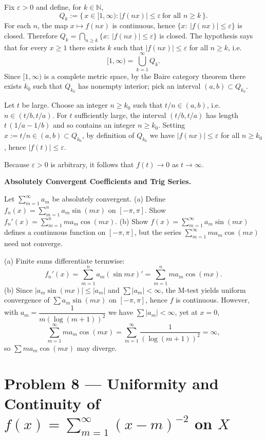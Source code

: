 \begin{solution}
Fix $\varepsilon>0$ and define, for $k\in\mathbb{N}$,
	\[
	Q_k:=\{\,x\in[1,\infty): |f(nx)|\le\varepsilon\ \text{for all } n\ge k\,\}.
	\]
	For each $n$, the map $x\mapsto f(nx)$ is continuous, hence
	$\{x:\ |f(nx)|\le\varepsilon\}$ is closed. Therefore $Q_k=\bigcap_{n\ge k}\{x:\ |f(nx)|\le\varepsilon\}$
	is closed. The hypothesis says that for every $x\ge1$ there exists $k$ such that
	$|f(nx)|\le\varepsilon$ for all $n\ge k$, i.e.
	\[
	[1,\infty)=\bigcup_{k=1}^\infty Q_k .
	\]
	Since $[1,\infty)$ is a complete metric space, by the Baire category theorem there exists
	$k_0$ such that $Q_{k_0}$ has nonempty interior; pick an interval $(a,b)\subset Q_{k_0}$.

	Let $t$ be large. Choose an integer $n\ge k_0$ such that $t/n\in(a,b)$, i.e.\ $n\in(t/b,t/a)$.
	For $t$ sufficiently large, the interval $(t/b,t/a)$ has length $t\,(1/a-1/b)$ and so contains
	an integer $n\ge k_0$. Setting $x:=t/n\in(a,b)\subset Q_{k_0}$, by definition of $Q_{k_0}$ we have
	$|f(nx)|\le\varepsilon$ for all $n\ge k_0$, hence $|f(t)|\le\varepsilon$.

	Because $\varepsilon>0$ is arbitrary, it follows that $f(t)\to 0$ as $t\to\infty$.
\end{solution}

\begin{problem}[CP-II-0342]
\label{prob:cp-ii-0342}
\textbf{Absolutely Convergent Coefficients and Trig Series.}

\hspace*{1.5em}Let $\sum_{m=1}^\infty a_m$ be absolutely convergent.
(a) Define $f_n(x)=\sum_{m=1}^n a_m\sin(mx)$ on $[-\pi,\pi]$. Show $f_n'(x)=\sum_{m=1}^n m a_m\cos(mx)$.
(b) Show $f(x)=\sum_{m=1}^\infty a_m\sin(mx)$ defines a continuous function on $[-\pi,\pi]$, but the series
$\sum_{m=1}^\infty m a_m\cos(mx)$ need not converge.
\end{problem}

\begin{solution}
(a) Finite sums differentiate termwise:
\[
f_n'(x)=\sum_{m=1}^n a_m(\sin mx)' = \sum_{m=1}^n m a_m\cos(mx).
\]
(b) Since $|a_m\sin(mx)|\le|a_m|$ and $\sum|a_m|<\infty$, the M-test yields uniform convergence of
$\sum a_m\sin(mx)$ on $[-\pi,\pi]$, hence $f$ is continuous.
However, with $a_m=\dfrac{1}{m(\log(m+1))^2}$ we have $\sum|a_m|<\infty$, yet at $x=0$,
\[
\sum_{m=1}^\infty m a_m\cos(mx)=\sum_{m=1}^\infty \frac{1}{(\log(m+1))^2}=\infty,
\]
so $\sum m a_m\cos(mx)$ may diverge.

\bigskip
\section*{Problem 8 --- Uniformity and Continuity of $\displaystyle f(x)=\sum_{m=1}^\infty (x-m)^{-2}$ on $X$}
\end{solution}

